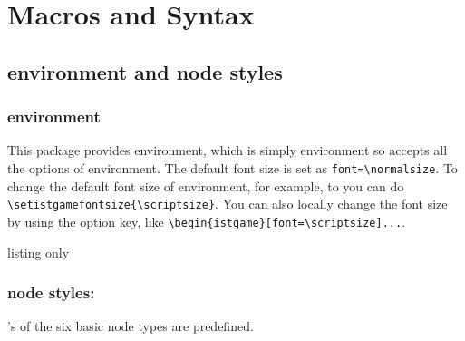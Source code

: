 \section{Macros and Syntax}

\subsection{environment  and node styles}

\subsubsection*{environment }

This package provides  environment, which is simply  environment
so accepts all the options of  environment.
The default font size is set as \verb|font=\normalsize|. 
To change the default font size of  environment, for example, to  you can do
\verb|\setistgamefontsize{\scriptsize}|.
You can also locally change the font size by using the  option key, like
\verb|\begin{istgame}[font=\scriptsize]...|. %

\begin{tcblisting}{listing only}
\def\istgamefontsize{\normalsize}
\NewDocumentCommand{} 
    {\renewcommand*{\istgamefontsize}{#1}
    }

    {\begin{tikzpicture}[%
        edge from parent path=%
            {(\tikzparentnode\istparentanchor) -- (\tikzchildnode\istchildanchor)},
        font=\istgamefontsize,#1
        ]
    }
    {\end{tikzpicture}
    }
\end{tcblisting}



\subsubsection*{node styles:}

's of the six basic node types are predefined.

